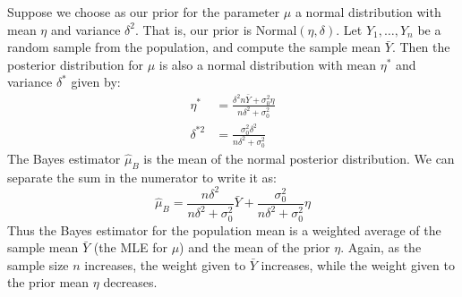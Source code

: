 \documentclass[12pt]{article}
\theoremstyle{definition}
\theoremstyle{remark}
\begin{document}
\begin{enumerate}
Suppose we choose as our prior for the parameter $\mu$ a normal distribution with mean $\eta$ and variance $\delta^2$. That is, our prior is Normal$(\eta, \delta)$. Let $Y_1, \dots, Y_n$ be a random sample from the population, and compute the sample mean $\bar{Y}$. Then the posterior distribution for $\mu$ is also a normal distribution with mean $\eta^*$ and variance $\delta^*$ given by:
\begin{align*}
\eta^* &= \frac{\delta^2 n \bar{Y} + \sigma_0^2 \eta}{n \delta^2 + \sigma_0^2} \\
\delta^{*2} &= \frac{\sigma_0^2 \delta^2 }{n \delta^2 + \sigma_0^2}
\end{align*}
The Bayes estimator $\hat{\mu}_B$ is the mean of the normal posterior distribution. We can separate the sum in the numerator to write it as:
\[
\hat{\mu}_B = \frac{ n \delta^2 }{n \delta^2 + \sigma_0^2}\bar{Y} + \frac{\sigma_0^2}{n \delta^2 + \sigma_0^2} \eta
\]
Thus the Bayes estimator for the population mean is a weighted average of the sample mean $\bar{Y}$ (the MLE for $\mu$) and the mean of the prior $\eta$. Again, as the sample size $n$ increases, the weight given to $\bar{Y}$ increases, while the weight given to the prior mean $\eta$ decreases.
\end{enumerate}
\end{document}

